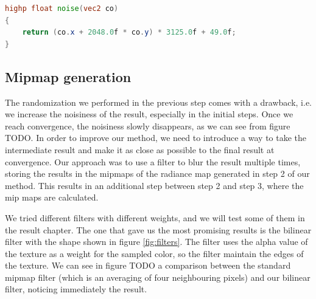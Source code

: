\begin{lstlisting}[language=GLSL,label=lst:lineargenerator,caption={Linear Congruential generator of random points on the GPU.}]
highp float noise(vec2 co)
{
    return (co.x + 2048.0f * co.y) * 3125.0f + 49.0f;
}
\end{lstlisting}

\subsection{Mipmap generation}
The randomization we performed in the previous step comes with a drawback, i.e. we increase the noisiness of the result, especially in the initial steps. Once we reach convergence, the noisiness slowly disappears, as we can see from figure TODO. In order to improve our method, we need to introduce a way to take the intermediate result and make it as close as possible to the final result at convergence. Our approach was to use a filter to blur the result multiple times, storing the results in the mipmaps of the radiance map generated in step 2 of our method. This results in an additional step between step 2 and step 3, where the mip maps are calculated.

We tried different filters with different weights, and we will test some of them in the result chapter. The one that gave us the most promising results is the bilinear filter with the shape shown in figure \ref{fig:filters}. The filter uses the alpha value of the texture as a weight for the sampled color, so the filter maintain the edges of the texture. We can see in figure TODO a comparison between the standard mipmap filter (which is an averaging of four neighbouring pixels) and our bilinear filter, noticing immediately the result.

